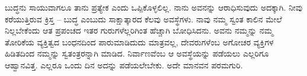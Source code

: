 \newpage

ಬುದ್ಧನು ಸಾಯುವಾಗಲೂ ತಾನು ಪ್ರತ್ಯೇಕ ಎಂದು ಒಪ್ಪಿಕೊಳ್ಳಲಿಲ್ಲ. ನಾನು ಅವನನ್ನು ಆರಾಧಿಸುವುದು ಅದಕ್ಕಾಗಿ. ನೀವು ಕರೆಯುತ್ತಿರುವ ಕ್ರಿಸ್ತ – ಬುದ್ಧ ಎಂಬುದು ಸಾಕ್ಷಾತ್ಕಾರದ ಕೆಲವು ಅವಸ್ಥೆಗಳು. ನಾವು ನಮ್ಮ ಸ್ವಂತ ಕಾಲಿನ ಮೇಲೆ ನಿಲ್ಲಬೇಕೆಂದು ಆತ ಪ್ರಪಂಚದ ಇತರ ಗುರುಗಳೆಲ್ಲರಿಗಿಂತ ಹೆಚ್ಚಾಗಿ ಬೋಧಿಸಿದನು. ಅವನು ನಮ್ಮನ್ನು ನಮ್ಮ ತೋರಿಕೆಯ ವ್ಯಕ್ತಿತ್ವದ ಬಂಧನದಿಂದ ಪಾರುಮಾಡಿದುದು ಮಾತ್ರವಲ್ಲ, ದೇವರುಗಳೆಂಬ ಅಗೋಚರ ವ್ಯಕ್ತಿಗಳ ಹಿಡಿತದಿಂದ ನಮ್ಮನ್ನು ಸ್ವತಂತ್ರರನ್ನಾಗಿ ಮಾಡಿದ. ನಿರ್ವಾಣವೆಂಬ ಆ ಅವಸ್ಥೆಯನ್ನು ಪಡೆಯಲು ಎಲ್ಲರಿಗೂ ಆಹ್ವಾನವಿತ್ತ. ಎಲ್ಲರೂ ಒಂದು ದಿನ ಅದನ್ನು ಪಡೆಯಲೇಬೇಕು. ಅದೇ ಮಾನವನ ಪರಮಗುರಿ.

